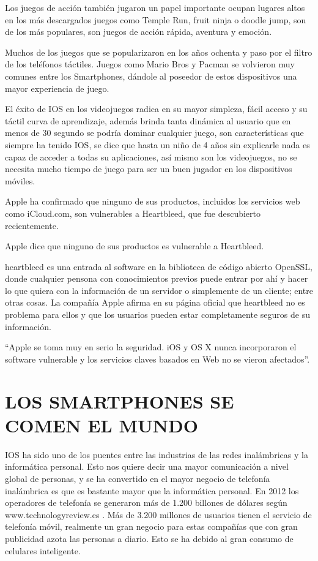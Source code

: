Los juegos de acción también jugaron un papel importante
ocupan lugares altos en los más descargados juegos como
Temple Run, fruit ninja o doodle jump, son de los más
populares, son juegos de acción rápida, aventura y emoción.

Muchos de los juegos que se popularizaron en los años ochenta
y paso por el filtro de los teléfonos táctiles. Juegos como Mario
Bros y Pacman se volvieron muy comunes entre los
Smartphones, dándole al poseedor de estos dispositivos una
mayor experiencia de juego.

El éxito de IOS en los videojuegos radica en su mayor simpleza,
fácil acceso y su táctil curva de aprendizaje, además brinda
tanta dinámica al usuario que en menos de 30 segundo se podría
dominar cualquier juego, son características que siempre ha
tenido IOS, se dice que hasta un niño de 4 años sin explicarle
nada es capaz de acceder a todas su aplicaciones, así mismo son
los videojuegos, no se necesita mucho tiempo de juego para ser
un buen jugador en los dispositivos móviles.

Apple ha confirmado que ninguno de sus productos, incluidos los
servicios web como iCloud.com, son vulnerables a Heartbleed, que
fue descubierto recientemente.

Apple dice que ninguno de sus
productos es vulnerable a
Heartbleed.

heartbleed es una entrada al software en la biblioteca de código
abierto OpenSSL, donde cualquier pensona con conocimientos
previos puede entrar por ahí y hacer lo que quiera con la
información de un servidor o simplemente de un cliente; entre
otras cosas. La compañía Apple afirma en su página oficial que
heartbleed no es problema para ellos y que los usuarios pueden estar
completamente seguros de su información.

“Apple se toma muy en serio la seguridad. iOS y OS X
nunca incorporaron el software vulnerable y los servicios
claves basados en Web no se vieron afectados”.


\section*{LOS SMARTPHONES SE COMEN EL MUNDO}

IOS ha sido uno de los puentes entre las industrias de las redes
inalámbricas y la informática personal. Esto nos quiere decir
una mayor comunicación a nivel global de personas, y se ha
convertido en el mayor negocio de telefonía inalámbrica es que
es bastante mayor que la informática personal. En 2012 los
operadores de telefonía se generaron más de 1.200 billones de
dólares según www.technologyreview.es . Más de 3.200 millones
de usuarios tienen el servicio de telefonía móvil, realmente un
gran negocio para estas compañías que con gran publicidad
azota las personas a diario. Esto se ha debido al gran consumo
de celulares inteligente.

